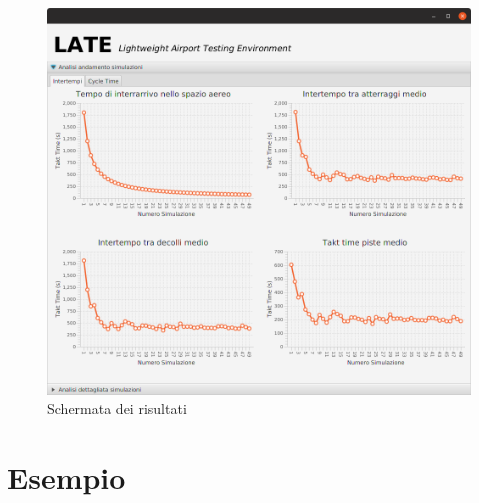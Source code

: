 \documentclass[a4paper, 12pt]{article}
\begin{document}
\begin{figure}[H]
\caption{Schermata dei risultati}
 \label{fig:schermataRisultati}
\hfill \includegraphics[height=0.42\textheight]{resources/images/Interfaccia_risultati.png}\hspace*{\fill}
\end{figure}


\newpage


\section{Esempio}
\end{document}
